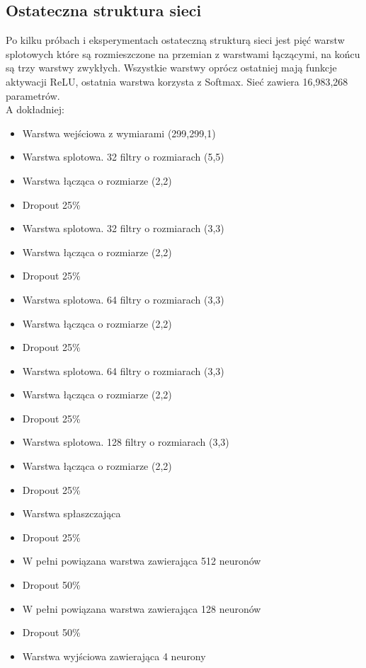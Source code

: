 \documentclass{article}
\begin{document}
\subsection{Ostateczna struktura sieci}
Po kilku próbach i eksperymentach ostateczną strukturą sieci jest pięć warstw splotowych które są rozmieszczone na przemian z warstwami łączącymi, na końcu są trzy warstwy zwykłych. Wszystkie warstwy oprócz ostatniej mają funkcje aktywacji ReLU, ostatnia warstwa korzysta z Softmax. Sieć zawiera 16,983,268 parametrów.\\

A dokładniej:
\begin{itemize}
	\item Warstwa wejściowa z wymiarami (299,299,1)
	
	\item Warstwa splotowa. 32 filtry o rozmiarach (5,5)
	\item Warstwa łącząca o rozmiarze (2,2)
	\item Dropout 25\%
	
	\item Warstwa splotowa. 32 filtry o rozmiarach (3,3)
	\item Warstwa łącząca o rozmiarze (2,2)
	\item Dropout 25\%
	
	\item Warstwa splotowa. 64 filtry o rozmiarach (3,3)
	\item Warstwa łącząca o rozmiarze (2,2)
	\item Dropout 25\%
	
	\item Warstwa splotowa. 64 filtry o rozmiarach (3,3)
	\item Warstwa łącząca o rozmiarze (2,2)
	\item Dropout 25\%
	
	\item Warstwa splotowa. 128 filtry o rozmiarach (3,3)
	\item Warstwa łącząca o rozmiarze (2,2)
	\item Dropout 25\%
	
	\item Warstwa spłaszczająca
	\item Dropout 25\%
	
	\item W pełni powiązana warstwa zawierająca 512 neuronów
	\item Dropout 50\%
	
	\item W pełni powiązana warstwa zawierająca 128 neuronów
	\item Dropout 50\%
	
	\item Warstwa wyjściowa zawierająca 4 neurony
\end{itemize}
\end{document}
